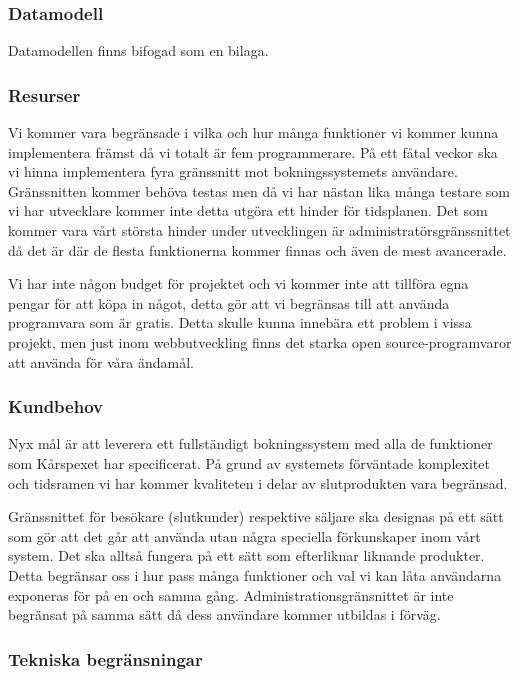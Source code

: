 \documentclass[a4paper, twoside, 11pt, titlepage]{article}
\begin{document}
		\subsubsection{Datamodell}


		Datamodellen finns bifogad som en bilaga.

		\subsubsection{Resurser}


		Vi kommer vara begränsade i vilka och hur många funktioner vi kommer kunna implementera främst då vi totalt är fem programmerare. På ett fåtal veckor ska vi hinna implementera fyra gränssnitt mot bokningssystemets användare. Gränssnitten kommer behöva testas men då vi har nästan lika många testare som vi har utvecklare kommer inte detta utgöra ett hinder för tidsplanen. Det som kommer vara vårt största hinder under utvecklingen är administratörsgränssnittet då det är där de flesta funktionerna kommer finnas och även de mest avancerade.

		Vi har inte någon budget för projektet och vi kommer inte att tillföra egna pengar för att köpa in något, detta gör att vi begränsas till att använda programvara som är gratis. Detta skulle kunna innebära ett problem i vissa projekt, men just inom webbutveckling finns det starka open source-programvaror att använda för våra ändamål.

		\subsubsection{Kundbehov}


		Nyx mål är att leverera ett fullständigt bokningssystem med alla de funktioner som Kårspexet har specificerat. På grund av systemets förväntade komplexitet och tidsramen vi har kommer kvaliteten i delar av slutprodukten vara begränsad.

		Gränssnittet för besökare (slutkunder) respektive säljare ska designas på ett sätt som gör att det går att använda utan några speciella förkunskaper inom vårt system. Det ska alltså fungera på ett sätt som efterliknar liknande produkter. Detta begränsar oss i hur pass många funktioner och val vi kan låta användarna exponeras för på en och samma gång. Administrationsgränsnittet är inte begränsat på samma sätt då dess användare kommer utbildas i förväg.

		\subsubsection{Tekniska begränsningar}
\end{document}
